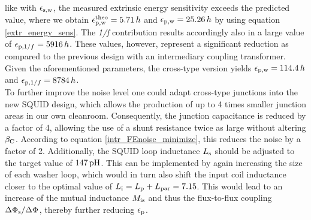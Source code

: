 like with $\epsilon_{\rm s,w}$, the measured extrinsic energy sensitivity exceeds the predicted value, where we obtain $\epsilon_{\rm p,w}^{\rm theo}=5.71\, h$ and $\epsilon_{\rm p,w}=25.26\, h$ by using equation \ref{extr_energy_sens}. The \textit{1/f} contribution results accordingly also in a large value of $\epsilon_{{\rm p},1/f}=5916\, h$. These values, however, represent a significant reduction as compared to the previous design with an intermediary coupling transformer. Given the aforementioned parameters, the cross-type version yields $\epsilon_{\rm p,w}=114.4\, h$ and $\epsilon_{{\rm p},1/f}=8784\, h$. \\

To further improve the noise level one could adapt cross-type junctions into the new SQUID design, which allows the production of up to 4 times smaller junction areas in our own cleanroom. Consequently, the junction capacitance is reduced by a factor of 4, allowing the use of a shunt resistance twice as large without altering $\beta_{\rm C}$. According to equation \ref{intr_FEnoise_minimize}, this reduces the noise by a factor of 2. Additionally, the SQUID loop inductance $L_{\rm s}$ should be adjusted to the target value of $\qty{147}{\pH}$. This can be implemented by again increasing the size of each washer loop, which would in turn also shift the input coil inductance closer to the optimal value of $L_{\rm i}=L_{\rm p}+L_{\rm par}=7.15$. This would lead to an increase of the mutual inductance $M_{\rm is}$ and thus the flux-to-flux coupling $\Delta\Phi_{\rm s}/\Delta\Phi_{\rm }$, thereby further reducing $\epsilon_{\rm p}$.               

